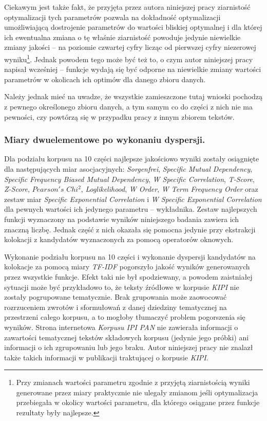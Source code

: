 \documentclass[11pt,a4paper]{llncs}
\begin{document}
\par
Ciekawym jest także fakt, że przyjęta przez autora niniejszej pracy ziarnistość optymalizacji tych parametrów pozwala na dokładność optymalizacji umożliwiającą dostrojenie parametrów do wartości bliskiej optymalnej i dla której ich ewentualna zmiana o tę właśnie ziarnistość powoduje jedynie niewielkie zmiany jakości -- na poziomie czwartej cyfry licząc od pierwszej cyfry niezerowej wyniku\footnote{Przy zmianach wartości parametru zgodnie z przyjętą ziarnistością wyniki generowane przez miary praktycznie nie ulegały zmianom jeśli optymalizacja przebiegała w okolicy wartości parametru, dla którego osiągane przez funkcje rezultaty były najlepsze.}.
Jednak powodem tego może być też to, o czym autor niniejszej pracy napisał wcześniej -- funkcje wydają się być odporne na niewielkie zmiany wartości parametrów w okolicach ich optimów dla danego zbioru danych.

\par
Należy jednak mieć na uwadze, że wszystkie zamieszczone tutaj wnioski pochodzą z pewnego określonego zbioru danych, a tym samym co do części z nich nie ma pewności, czy powtórzą się w przypadku pracy z innym zbiorem tekstów.


\subsubsection{Miary dwuelementowe po wykonaniu dyspersji.}
Dla podziału korpusu na 10 części najlepsze jakościowo wyniki zostały osiągnięte dla następujących miar asocjacyjnych: \emph{Sorgenfrei}, \emph{Specific Mutual Dependency}, \emph{Specific Frequency Biased Mutual Dependency}, \emph{W Specific Correlation}, \emph{T-Score}, \emph{Z-Score}, $ Pearson's $ $ Chi^{2} $, \emph{Loglikelihood}, \emph{W Order}, \emph{W Term Frequency Order} oraz zestaw miar \emph{Specific Exponential Correlation} i \emph{W Specific Exponential Correlation} dla pewnych wartości ich jedynego parametru -- wykładnika.
Zestaw najlepszych funkcji wyznaczony na podstawie wyników niniejszego badania zawiera ich znaczną liczbę.
Jednak część z nich okazała się pomocna jedynie przy ekstrakcji kolokacji z kandydatów wyznaczonych za pomocą operatorów oknowych.

\par
Wykonanie podziału korpusu na 10 części i wykonanie dyspersji kandydatów na kolokacje za pomocą miary \emph{TF-IDF} pogorszyło jakość wyników generowanych przez wszystkie funkcje.
Efekt taki nie był spodziewany, a powodem zaistniałej sytuacji może być przykładowo to, że teksty źródłowe w korpusie \emph{KIPI} nie zostały pogrupowane tematycznie.
Brak grupowania może zaowocować rozrzuceniem zwrotów i sformułowań z danej dziedziny tematycznej na przestrzeni całego korpusu, a to mogłoby tłumaczyć problem pogorszenia się wyników.
Strona internetowa \emph{Korpusu IPI PAN} \cite{korpus_ipi_pan} nie zawierała informacji o zawartości tematycznej tekstów składowych korpusu (jedynie jego próbki) ani informacji o ich zgrupowaniu lub jego braku.
Autor niniejszej pracy nie znalazł także takich informacji w publikacji traktującej o korpusie \emph{KIPI}\cite{korpus_ipi_pan_publikacja}.
\end{document}
